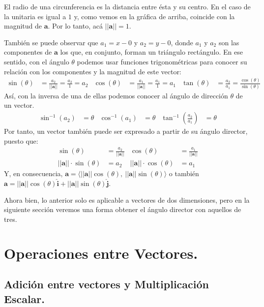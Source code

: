 \documentclass[12pt]{article}
\begin{document}
El radio de una circunferencia es la distancia entre ésta y su centro. En el caso de la unitaria es igual a $1$ y, como vemos en la gráfica de arriba, coincide con la magnitud de $\mathbf{a}$. Por lo tanto, acá $||\mathbf{a}|| = 1$.

También se puede observar que $a_{1} = x - 0$ y $a_{2} = y - 0$, donde $a_{1}$ y $a_{2}$ son las componentes de $\mathbf{a}$ los que, en conjunto, forman un triángulo rectángulo. En ese sentido, con el ángulo $\theta$ podemos usar funciones trigonométricas para conocer su relación con los componentes y la magnitud de este vector:
\begin{align*}
\sin(\theta) &= \frac{a_{2}}{||\mathbf{a}||} = \frac{a_{2}}{1} = a_{2} &
\cos(\theta) &= \frac{a_{1}}{||\mathbf{a}||} = \frac{a_{1}}{1} = a_{1} &
\tan(\theta) &= \frac{a_{2}}{a_{1}} = \frac{\cos(\theta)}{\sin(\theta)}
\end{align*}
Así, con la inversa de una de ellas podemos conocer al ángulo de dirección $\theta$ de un vector.
\begin{align*}
\sin^{-1}(a_{2}) &= \theta &
\cos^{-1}(a_{1}) &= \theta &
\tan^{-1}\left(\frac{a_{2}}{a_{1}}\right) &= \theta
\end{align*}
Por tanto, un vector también puede ser expresado a partir de su ángulo director, puesto que:
\begin{align*}
\sin(\theta) &= \frac{a_{2}}{||\mathbf{a}||} & \cos(\theta) &= \frac{a_{1}}{||\mathbf{a}||} \\
||\mathbf{a}|| \cdot \sin(\theta) &= a_{2} & ||\mathbf{a}|| \cdot \cos(\theta) &= a_{1}
\end{align*}
Y, en consecuencia, $\mathbf{a} = \langle ||\mathbf{a}|| \cos(\theta), \ ||\mathbf{a}|| \sin(\theta) \rangle$ o también $\mathbf{a} = ||\mathbf{a}||\cos(\theta)\hat{\mathbf{i}} + ||\mathbf{a}||\sin(\theta)\hat{\mathbf{j}}$.

Ahora bien, lo anterior solo es aplicable a vectores de dos dimensiones, pero en la siguiente sección veremos una forma obtener el ángulo director con aquellos de tres.

\section{Operaciones entre Vectores.}

\subsection{Adición entre vectores y Multiplicación Escalar.}
\end{document}
